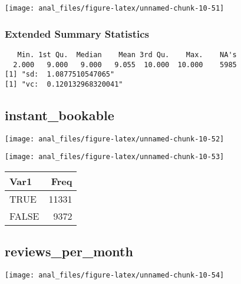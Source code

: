 \begin{center}\texttt{[image: anal\_files/figure-latex/unnamed-chunk-10-51]} \end{center}

\hypertarget{extended-summary-statistics-18}{%
\subsubsection{Extended Summary
Statistics}\label{extended-summary-statistics-18}}

\begin{verbatim}   Min. 1st Qu.  Median    Mean 3rd Qu.    Max.    NA's 
  2.000   9.000   9.000   9.055  10.000  10.000    5985 
[1] "sd:  1.0877510547065"
[1] "vc:  0.120132968320041"
\end{verbatim}

\pagebreak

\hypertarget{instant_bookable}{%
\subsection{instant\_bookable}\label{instant_bookable}}

\begin{center}\texttt{[image: anal\_files/figure-latex/unnamed-chunk-10-52]} \end{center}

\begin{center}\texttt{[image: anal\_files/figure-latex/unnamed-chunk-10-53]} \end{center}

\begin{table}[H]
\centering
\begin{tabular}[t]{lr}
\toprule
Var1 & Freq\\
\midrule
TRUE & 11331\\
FALSE & 9372\\
\bottomrule
\end{tabular}
\end{table}
\pagebreak

\hypertarget{reviews_per_month}{%
\subsection{reviews\_per\_month}\label{reviews_per_month}}

\begin{center}\texttt{[image: anal\_files/figure-latex/unnamed-chunk-10-54]} \end{center}

